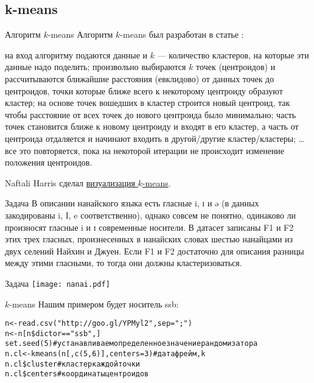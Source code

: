 \subsection{k-means}
\begin{frame}{Алгоритм $k$-means}
\vspace{-2.5mm}
Алгоритм $k$-means был разработан в статье \citep{lloyd82}:
\begin{itemize}
\mytem на вход алгоритму подаются данные и $k$ — количество кластеров, на которые эти данные надо поделить;
\mytem произвольно выбираются $k$ точек (центроидов) и рассчитываются ближайшие расстояния (евклидово) от данных точек до центроидов, точки которые ближе всего к некоторому центроиду образуют кластер;
\mytem на основе точек вошедших в кластер строится новый центроид, так чтобы расстояние от всех точек до нового центроида было минимально;
\mytem часть точек становится ближе к новому центроиду и входят в его кластер, а часть от центроида отдаляется и начинают входить в другой/другие кластер/кластеры;
\mytem … все это повторяется, пока на некоторой итерации не происходит изменение положения центроидов.
\end{itemize}
Naftali Harris сделал \alert{\href{http://www.naftaliharris.com/blog/visualizing-k-means-clustering/}{визуализация $k$-means}}.
\end{frame}
\begin{frame}{Задача}
В описании нанайского языка есть гласные i, ɪ и ə (в данных закодированы i, I, e соответственно), однако совсем не понятно, одинаково ли произносят гласные i и ɪ современные носители. В датасет записаны F1 и F2 этих трех гласных, произнесенных в нанайских словах шестью нанайцами из двух селений Найхин и Джуен. Если F1 и F2 достаточно для описания разницы между этими гласными, то тогда они должны кластеризоваться.
\end{frame}
\begin{frame}{Задача}
\texttt{[image: nanai.pdf]}
\end{frame}
\begin{frame}{$k$-means}
Нашим примером будет носитель ssb:
\scriptsize
\begin{alltt}
n <- read.csv("http://goo.gl/YPMyl2"{}, sep = ";")\\
n <- n[n\$dictor == "ssb"{},]\bigskip\\
set.seed(5) \hfill \# устанавливаем определенное значение рандомизатора\\
n.cl <- \alert{kmeans}(n[, c(5,6)], \alert{centers = 3}) \hfill \# датафрейм, k\\
n.cl\alert{\$cluster} \hfill \# кластер каждой точки\\
n.cl\alert{\$centers} \hfill \# координаты центроидов\\
\end{alltt}
\end{frame}
